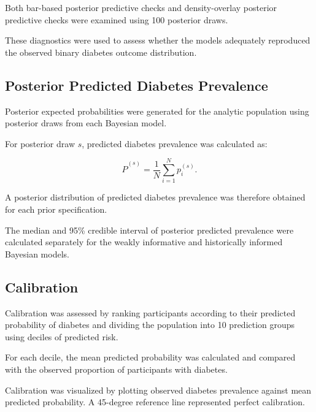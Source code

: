 \documentclass[12pt]{article}
\begin{document}
Both bar-based posterior predictive checks and density-overlay posterior predictive checks were examined using 100 posterior draws.

These diagnostics were used to assess whether the models adequately reproduced the observed binary diabetes outcome distribution.


\subsection{Posterior Predicted Diabetes Prevalence}

Posterior expected probabilities were generated for the analytic population using posterior draws from each Bayesian model.

For posterior draw \(s\), predicted diabetes prevalence was calculated as:

\[
\widehat{P}^{(s)}
=
\frac{1}{N}
\sum_{i=1}^{N}
p_i^{(s)}.
\]

A posterior distribution of predicted diabetes prevalence was therefore obtained for each prior specification.

The median and 95\% credible interval of posterior predicted prevalence were calculated separately for the weakly informative and historically informed Bayesian models.


\subsection{Calibration}

Calibration was assessed by ranking participants according to their predicted probability of diabetes and dividing the population into 10 prediction groups using deciles of predicted risk.

For each decile, the mean predicted probability was calculated and compared with the observed proportion of participants with diabetes.

Calibration was visualized by plotting observed diabetes prevalence against mean predicted probability. A 45-degree reference line represented perfect calibration.

\end{document}
